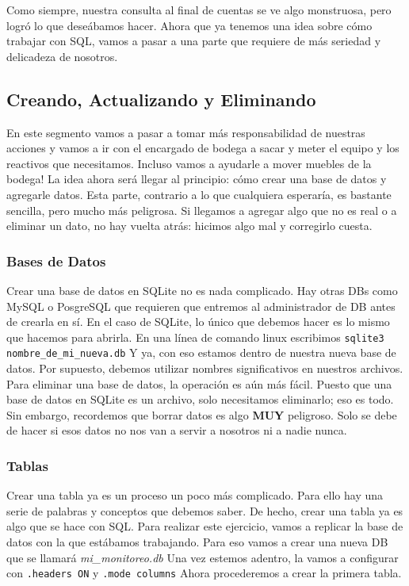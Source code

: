 \documentclass[10pt,letterpaper]{article}
\newcommand{\inlinecode}[1]{
\colorbox{light-gray}{\texttt{#1}}
}
\begin{document}
Como siempre, nuestra consulta al final de cuentas se ve algo monstruosa, pero logr\'o lo que dese\'abamos hacer. Ahora que ya tenemos una idea sobre c\'omo trabajar con SQL, vamos a pasar a una parte que requiere de m\'as seriedad y delicadeza de nosotros.

\subsection{Creando, Actualizando y Eliminando}
En este segmento vamos a pasar a tomar m\'as responsabilidad de nuestras acciones y vamos a ir con el encargado de bodega a sacar y meter el equipo y los reactivos que necesitamos. Incluso vamos a ayudarle a mover muebles de la bodega! La idea ahora ser\'a llegar al principio: c\'omo crear una base de datos y agregarle datos. Esta parte, contrario a lo que cualquiera esperar\'ia, es bastante sencilla, pero mucho m\'as peligrosa. Si llegamos a agregar algo que no es real o a eliminar un dato, no hay vuelta atr\'as: hicimos algo mal y corregirlo cuesta.

\subsubsection{Bases de Datos}
Crear una base de datos en SQLite no es nada complicado. Hay otras DBs como MySQL o PosgreSQL que requieren que entremos al administrador de DB antes de crearla en s\'i. En el caso de SQLite, lo \'unico que debemos hacer es lo mismo que hacemos para abrirla. En una l\'inea de comando linux escribimos \inlinecode{sqlite3 nombre\_de\_mi\_nueva.db} Y ya, con eso estamos dentro de nuestra nueva base de datos. Por supuesto, debemos utilizar nombres significativos en nuestros archivos.\\

Para eliminar una base de datos, la operaci\'on es a\'un m\'as f\'acil. Puesto que una base de datos en SQLite es un archivo, solo necesitamos eliminarlo; eso es todo. Sin embargo, recordemos que borrar datos es algo \textbf{MUY} peligroso. Solo se debe de hacer si esos datos no nos van a servir a nosotros ni a nadie nunca.

\subsubsection{Tablas}
Crear una tabla ya es un proceso un poco m\'as complicado. Para ello hay una serie de palabras y conceptos que debemos saber. De hecho, crear una tabla ya es algo que se hace con SQL. Para realizar este ejercicio, vamos a replicar la base de datos con la que est\'abamos trabajando. Para eso vamos a crear una nueva DB que se llamar\'a \emph{mi\_monitoreo.db} Una vez estemos adentro, la vamos a configurar con \inlinecode{.headers ON} y \inlinecode{.mode columns} Ahora procederemos a crear la primera tabla.
\end{document}
